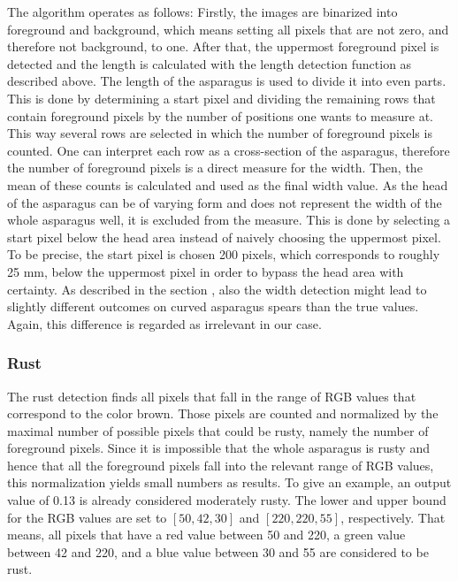 \bigskip
The algorithm operates as follows: Firstly, the images are binarized into foreground and background, which means setting all pixels that are not zero, and therefore not background, to one. After that, the uppermost foreground pixel is detected and the length is calculated with the length detection function as described above. The length of the asparagus is used to divide it into even parts. This is done by determining a start pixel and dividing the remaining rows that contain foreground pixels by the number of positions one wants to measure at. This way several rows are selected in which the number of foreground pixels is counted. One can interpret each row as a cross-section of the asparagus, therefore the number of foreground pixels is a direct measure for the width. Then, the mean of these counts is calculated and used as the final width value. As the head of the asparagus can be of varying form and does not represent the width of the whole asparagus well, it is excluded from the measure. This is done by selecting a start pixel below the head area instead of naively choosing the uppermost pixel. To be precise, the start pixel is chosen 200 pixels, which corresponds to roughly 25 mm, below the uppermost pixel in order to bypass the head area with certainty. As described in the section , also the width detection might lead to slightly different outcomes on curved asparagus spears than the true values. Again, this difference is regarded as irrelevant in our case.

\subsubsection{Rust}
\label{subsec:Rust}

The rust detection finds all pixels that fall in the range of RGB values that correspond to the color brown. Those pixels are counted and normalized by the maximal number of possible pixels that could be rusty, namely the number of foreground pixels. Since it is impossible that the whole asparagus is rusty and hence that all the foreground pixels fall into the relevant range of RGB values, this normalization yields small numbers as results. To give an example, an output value of 0.13 is already considered moderately rusty. The lower and upper bound for the RGB values are set to $[50,42,30]$ and $[220,220,55]$, respectively. That means, all pixels that have a red value between 50 and 220, a green value between 42 and 220, and a blue value between 30 and 55 are considered to be rust.

